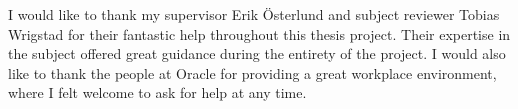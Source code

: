 I would like to thank my supervisor Erik Österlund and subject reviewer Tobias Wrigstad for their fantastic help throughout this thesis project. Their expertise in the subject offered great guidance during the entirety of the project. I would also like to thank the people at Oracle for providing a great workplace environment, where I felt welcome to ask for help at any time.

